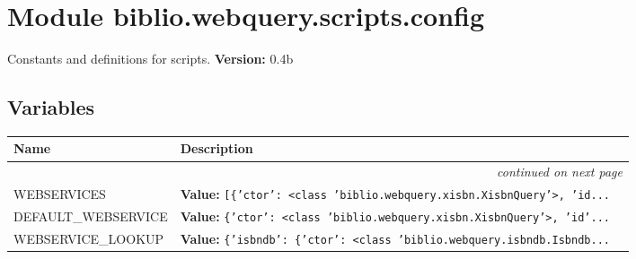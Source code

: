 %
%
%


\section{Module biblio.webquery.scripts.config}

    \label{biblio:webquery:scripts:config}

Constants and definitions for scripts.
\textbf{Version:} 0.4b





  \subsection{Variables}

    \vspace{-1cm}
\hspace{\varindent}\begin{longtable}{|p{\varnamewidth}|p{\vardescrwidth}|l}
\cline{1-2}
\cline{1-2} \centering \textbf{Name} & \centering \textbf{Description}& \\
\cline{1-2}
\endhead\cline{1-2}\multicolumn{3}{r}{\small\textit{continued on next page}}\\\endfoot\cline{1-2}
\endlastfoot\raggedright W\-E\-B\-S\-E\-R\-V\-I\-C\-E\-S\- & \raggedright \textbf{Value:} 
{\tt \texttt{[}\texttt{\{}\texttt{'}\texttt{ctor}\texttt{'}\texttt{: }{\textless}class 'biblio.webquery.xisbn.XisbnQuery'{\textgreater}\texttt{, }\texttt{'}\texttt{id}\texttt{...}}&\\
\cline{1-2}
\raggedright D\-E\-F\-A\-U\-L\-T\-\_\-W\-E\-B\-S\-E\-R\-V\-I\-C\-E\- & \raggedright \textbf{Value:} 
{\tt \texttt{\{}\texttt{'}\texttt{ctor}\texttt{'}\texttt{: }{\textless}class 'biblio.webquery.xisbn.XisbnQuery'{\textgreater}\texttt{, }\texttt{'}\texttt{id}\texttt{'}\texttt{...}}&\\
\cline{1-2}
\raggedright W\-E\-B\-S\-E\-R\-V\-I\-C\-E\-\_\-L\-O\-O\-K\-U\-P\- & \raggedright \textbf{Value:} 
{\tt \texttt{\{}\texttt{'}\texttt{isbndb}\texttt{'}\texttt{: }\texttt{\{}\texttt{'}\texttt{ctor}\texttt{'}\texttt{: }{\textless}class 'biblio.webquery.isbndb.Isbndb\texttt{...}}&\\
\cline{1-2}
\end{longtable}

